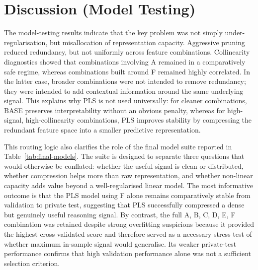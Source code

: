 \documentclass{article}
\theoremstyle{plain}
\theoremstyle{definition}
\theoremstyle{remark}
\begin{document}
\section{Discussion (Model Testing)}
The model-testing results indicate that the key problem was not simply under-regularisation, but misallocation of representation capacity. Aggressive pruning reduced redundancy, but not uniformly across feature combinations. Collinearity diagnostics showed that combinations involving A remained in a comparatively safe regime, whereas combinations built around F remained highly correlated. In the latter case, broader combinations were not intended to remove redundancy; they were intended to add contextual information around the same underlying signal. This explains why PLS is not used universally: for cleaner combinations, BASE preserves interpretability without an obvious penalty, whereas for high-signal, high-collinearity combinations, PLS improves stability by compressing the redundant feature space into a smaller predictive representation.

This routing logic also clarifies the role of the final model suite reported in Table~\ref{tab:final-models}. The suite is designed to separate three questions that would otherwise be conflated: whether the useful signal is clean or distributed, whether compression helps more than raw representation, and whether non-linear capacity adds value beyond a well-regularised linear model. The most informative outcome is that the PLS model using F alone remains comparatively stable from validation to private test, suggesting that PLS successfully compressed a dense but genuinely useful reasoning signal. By contrast, the full A, B, C, D, E, F combination was retained despite strong overfitting suspicions because it provided the highest cross-validated score and therefore served as a necessary stress test of whether maximum in-sample signal would generalise. Its weaker private-test performance confirms that high validation performance alone was not a sufficient selection criterion.
\end{document}
